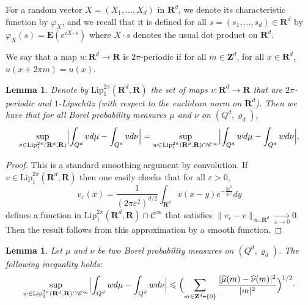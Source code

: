 \documentclass[12pt]{amsart}
\renewcommand{\mathcal}{\mathscr}
\def\setminus{\mathchoice
	{\mathbin{\vrule height .62ex width 1.61ex depth -.38ex}}%
	{\mathbin{\vrule height .62ex width 1.61ex depth -.38ex}}%
	{\mathbin{\vrule height .50ex width 0.85ex depth -.28ex}}%
	{\mathbin{\vrule height .20ex width 0.570ex depth -.24ex}}%
}
\newcommand{\Zz}{\mathbf{Z}}
\newcommand{\Rr}{\mathbf{R}}
\newcommand{\expect}{\mathbf{E}}
\renewcommand{\hat}{\widehat}
\renewcommand{\rho}{\varrho}
\theoremstyle{plain}
\newtheorem{lemma}[theorem]{Lemma}
\theoremstyle{remark}
\theoremstyle{definition}
\begin{document}
For a random vector $X = (X_1, \dots, X_d)$ in $\Rr^d$, we denote its
characteristic function by $\varphi_X$, and we recall that it is
defined for all $s = (s_1, \dots, s_d) \in \Rr^d$ by
$\varphi_X(s) = \expect\left(e^{i X\cdot s}\right)$ where $X \cdot s$
denotes the usual dot product on $\Rr^d$.

We say that a map $u \colon \Rr^d \to \Rr$ is $2 \pi$-periodic if for
all $m \in \Zz^d$, for all $x \in \Rr^d$, $u(x+ 2 \pi m) = u(x)$.


\begin{lemma}\label{lem: lip1 smooth}
  Denote by $\mathrm{Lip}^{2\pi}_1(\Rr^d, \Rr)$ the set of maps
  $v \colon \Rr^d \to \Rr$ that are $2\pi$-periodic and $1$-Lipschitz
  (with respect to the euclidean norm on $\Rr^d$). Then we have that
  for all Borel probability measures $\mu$ and $\nu$ on
  $(Q^d, \rho_d)$,
  $$
  \sup_{v \in \mathrm{Lip}^{2\pi}_1(\Rr^d, \Rr)} \Bigl|\int_{Q^d} v
    d \mu - \int_{Q^d} v d \nu \Bigr| = \sup_{w \in
    \mathrm{Lip}^{2\pi}_1(\Rr^d, \Rr) \cap \mathcal{C}^{\infty}}
  \Bigl|\int_{Q^d} w d \mu - \int_{Q^d} w d \nu
  \Bigr|.
  $$
\end{lemma}

\begin{proof}
  This is a standard smoothing argument by convolution. If
  $v \in \mathrm{Lip}^{2\pi}_1(\Rr^d, \Rr)$ then one easily checks
  that for all $\varepsilon > 0$,
  $$
  v_{\varepsilon}(x) = \frac{1}{(2 \pi \varepsilon^2)^{d/2}} \int_{\Rr^d} v(x-y) e^{-\frac{|y|^2}{2 \varepsilon^2}} dy
  $$
  defines a function in
  $\mathrm{Lip}^{2\pi}_1(\Rr^d, \Rr) \cap \mathcal{C}^{\infty}$ that
  satisfies
  $\| v_{\varepsilon} - v \|_{\infty, \Rr^d} \underset{\varepsilon \to
    0}{\longrightarrow} 0$. Then the result follows from this
  approximation by a smooth function.
\end{proof}

\begin{lemma}\label{lem: cauchy-schwarz}
  Let $\mu$ and $\nu$ be two Borel probability measures on
  $(Q^d, \rho_d)$. The following inequality holds:
  $$
  \sup_{w \in \mathrm{Lip}^{2\pi}_1(\Rr^d, \Rr) \cap
    \mathcal{C}^{\infty}} \Bigl|\int_{Q^d} w d \mu -
  \int_{Q^d} w d \nu \Bigr| \leqslant \Bigl(\sum_{m \in \Zz^d
    \setminus \{0\}}^{} \frac{|\hat{\mu}(m) -
    \hat{\nu}(m)|^2}{|m|^2}\Bigr)^{1/2} \cdot
  $$
\end{lemma}
\end{document}
